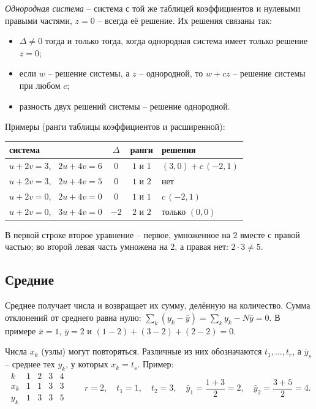 \documentclass[12pt,a4paper]{article}
\begin{document}
\emph{Однородная система} -- система с той же таблицей коэффициентов и
нулевыми правыми частями, $z = 0$ -- всегда её решение. Их решения связаны так:
\begin{itemize}[itemsep=0pt, parsep=0pt, topsep=2pt]
  \item $\Delta \ne 0$ тогда и только тогда, когда однородная система имеет
    только решение $z = 0$;
  \item если $w$ -- решение системы, а $z$ -- однородной, то $w + cz$ --
    решение системы при любом $c$;
  \item разность двух решений системы -- решение однородной.
\end{itemize}
Примеры (ранги таблицы коэффициентов и расширенной):
\begin{center}
\begin{tabular}{lccl}
\toprule
система & $\Delta$ & ранги & решения \\
\midrule
$u + 2v = 3$, \ $2u + 4v = 6$ & $0$ & $1$ и $1$ & $(3, 0) + c\,(-2, 1)$ \\
$u + 2v = 3$, \ $2u + 4v = 5$ & $0$ & $1$ и $2$ & нет \\
$u + 2v = 0$, \ $2u + 4v = 0$ & $0$ & $1$ и $1$ & $c\,(-2, 1)$ \\
$u + 2v = 0$, \ $3u + 4v = 0$ & $-2$ & $2$ и $2$ & только $(0, 0)$ \\
\bottomrule
\end{tabular}
\end{center}
В первой строке второе уравнение -- первое, умноженное на 2 вместе с правой
частью; во второй левая часть умножена на 2, а правая нет: $2 \cdot 3 \ne 5$.

\subsection{Средние}

Среднее получает числа и возвращает их сумму, делённую на количество. Сумма
отклонений от среднего равна нулю: $\sum_k (y_k - \bar y) = \sum_k y_k - N\bar y
= 0$. В примере $\bar x = 1$, $\bar y = 2$ и $(1 - 2) + (3 - 2) + (2 - 2) = 0$.

Числа $x_k$ (узлы) могут повторяться. Различные из них обозначаются
$t_1, \dots, t_r$,
а $\bar y_s$ -- среднее тех $y_k$, у которых $x_k = t_s$. Пример:
\[
  \begin{array}{c|cccc}
    k & 1 & 2 & 3 & 4\\ \hline
    x_k & 1 & 1 & 3 & 3\\
    y_k & 1 & 3 & 3 & 5
  \end{array}
  \qquad
  r = 2, \quad t_1 = 1, \quad t_2 = 3, \quad
  \bar y_1 = \frac{1 + 3}{2} = 2, \quad \bar y_2 = \frac{3 + 5}{2} = 4 .
\]
\end{document}
